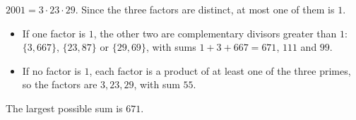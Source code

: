 $2001=3\cdot23\cdot29$. Since the three factors are distinct, at most one of them is $1$.
\begin{itemize}
\item If one factor is $1$, the other two are complementary divisors greater than $1$: $\{3,667\}$, $\{23,87\}$ or $\{29,69\}$, with sums $1+3+667=671$, $111$ and $99$.
\item If no factor is $1$, each factor is a product of at least one of the three primes, so the factors are $3,23,29$, with sum $55$.
\end{itemize}
The largest possible sum is $\boxed{671}$.

